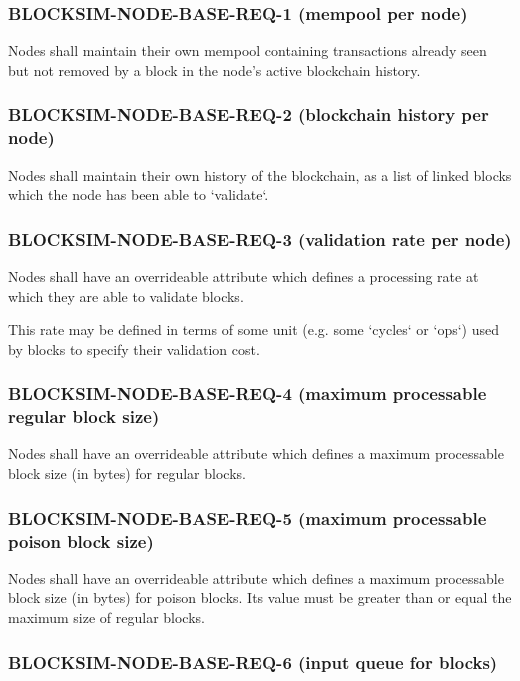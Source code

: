 \documentclass{scrreprt}
\begin{document}
\subsubsection{BLOCKSIM-NODE-BASE-REQ-1 (mempool per node)}

Nodes shall maintain their own mempool containing transactions already seen
but not removed by a block in the node's active blockchain history.


\subsubsection{BLOCKSIM-NODE-BASE-REQ-2 (blockchain history per node)}

Nodes shall maintain their own history of the blockchain, as a list of
linked blocks which the node has been able to `validate`.


\subsubsection{BLOCKSIM-NODE-BASE-REQ-3 (validation rate per node)}

Nodes shall have an overrideable attribute which defines a processing rate
at which they are able to validate blocks.

This rate may be defined in terms of some unit (e.g. some `cycles` or `ops`)
used by blocks to specify their validation cost.


\subsubsection{BLOCKSIM-NODE-BASE-REQ-4 (maximum processable regular block size)}

Nodes shall have an overrideable attribute which defines a maximum processable
block size (in bytes) for regular blocks.


\subsubsection{BLOCKSIM-NODE-BASE-REQ-5 (maximum processable poison block size)}

Nodes shall have an overrideable attribute which defines a maximum processable
block size (in bytes) for poison blocks. Its value must be greater than or
equal the maximum size of regular blocks.


\subsubsection{BLOCKSIM-NODE-BASE-REQ-6 (input queue for blocks)}
\end{document}

